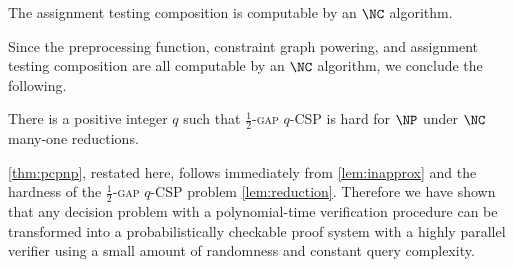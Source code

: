 \begin{lemma}
  The assignment testing composition is computable by an $\NC$ algorithm.
\end{lemma}

Since the preprocessing function, constraint graph powering, and assignment testing composition are all computable by an $\NC$ algorithm, we conclude the following.

\begin{lemma}\label{lem:reduction}
  There is a positive integer $q$ such that \textsc{$\frac{1}{2}$-gap $q$-CSP} is hard for $\NP$ under $\NC$ many-one reductions.
\end{lemma}

\autoref{thm:pcpnp}, restated here, follows immediately from \autoref{lem:inapprox} and the hardness of the \textsc{$\frac{1}{2}$-gap $q$-CSP} problem \autoref{lem:reduction}.
Therefore we have shown that any decision problem with a polynomial-time verification procedure can be transformed into a probabilistically checkable proof system with a highly parallel verifier using a small amount of randomness and constant query complexity.

\pcpnp*
